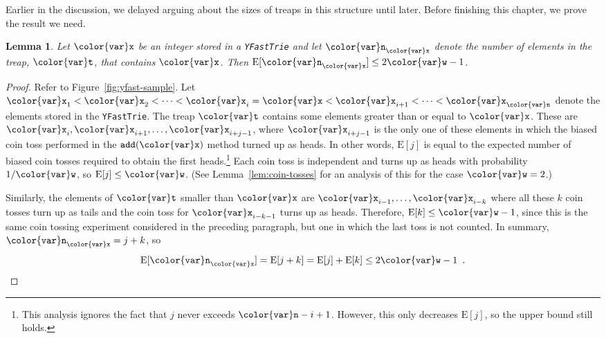 \documentclass[10pt]{book}
\newcommand{\figref}[1]{Figure~\ref{fig:#1}}
\theoremstyle{plain}
\newtheorem{lem}{Lemma}[chapter]
\newcommand{\lemlabel}[1]{\label{lem:#1}}
\newcommand{\lemref}[1]{Lemma~\ref{lem:#1}}
\theoremstyle{definition}
\newcommand{\E}{\mathrm{E}}
\begin{document}
Earlier in the discussion, we delayed arguing about the sizes of treaps
in this structure until later.  Before finishing this chapter, we prove
the result we need.

\begin{lem}\lemlabel{yfast-subtreesize}
Let \ensuremath{\mathtt{{\color{var}x}}} be an integer stored in a \texttt{YFastTrie} and let $\ensuremath{\mathtt{{\color{var}n}}}_\ensuremath{\mathtt{{\color{var}x}}}$
denote the number of elements in the treap, \ensuremath{\mathtt{{\color{var}t}}}, that contains \ensuremath{\mathtt{{\color{var}x}}}.
Then $\E[\ensuremath{\mathtt{{\color{var}n}}}_\ensuremath{\mathtt{{\color{var}x}}}] \le 2\ensuremath{\mathtt{{\color{var}w}}}-1$.
\end{lem}

\begin{proof}
Refer to \figref{yfast-sample}. Let
$\ensuremath{\mathtt{{\color{var}x}}}_1<\ensuremath{\mathtt{{\color{var}x}}}_2<\cdots<\ensuremath{\mathtt{{\color{var}x}}}_i=\ensuremath{\mathtt{{\color{var}x}}}<\ensuremath{\mathtt{{\color{var}x}}}_{i+1}<\cdots<\ensuremath{\mathtt{{\color{var}x}}}_\ensuremath{\mathtt{{\color{var}n}}}$ denote
the elements stored
in the \texttt{YFastTrie}.  The treap \ensuremath{\mathtt{{\color{var}t}}} contains some elements greater than
or equal to \ensuremath{\mathtt{{\color{var}x}}}.  These are $\ensuremath{\mathtt{{\color{var}x}}}_i,\ensuremath{\mathtt{{\color{var}x}}}_{i+1},\ldots,\ensuremath{\mathtt{{\color{var}x}}}_{i+j-1}$,
where $\ensuremath{\mathtt{{\color{var}x}}}_{i+j-1}$ is the only one of these elements in which the
biased coin toss performed in the \ensuremath{\mathtt{add({\color{var}x})}} method turned up as heads.
In other words, $\E[j]$ is equal to the expected number of biased coin
tosses required to obtain the first heads.\footnote{This analysis ignores
the fact that $j$ never exceeds $\ensuremath{\mathtt{{\color{var}n}}}-i+1$.  However, this only decreases
$\E[j]$, so the upper bound still holds.}  Each coin toss is independent
and turns up as heads with probability $1/\ensuremath{\mathtt{{\color{var}w}}}$, so $\E[j]\le\ensuremath{\mathtt{{\color{var}w}}}$.
(See \lemref{coin-tosses} for an analysis of this for the case $\ensuremath{\mathtt{{\color{var}w}}}=2$.)

Similarly, the elements of \ensuremath{\mathtt{{\color{var}t}}} smaller than \ensuremath{\mathtt{{\color{var}x}}} are
$\ensuremath{\mathtt{{\color{var}x}}}_{i-1},\ldots,\ensuremath{\mathtt{{\color{var}x}}}_{i-k}$ where all these $k$ coin tosses turn up as
tails and the coin toss for $\ensuremath{\mathtt{{\color{var}x}}}_{i-k-1}$ turns up as heads.  Therefore,
$\E[k]\le\ensuremath{\mathtt{{\color{var}w}}}-1$, since this is the same coin tossing experiment considered
in the preceding paragraph, but one in which the last toss is not counted.
In summary, $\ensuremath{\mathtt{{\color{var}n}}}_\ensuremath{\mathtt{{\color{var}x}}}=j+k$, so
\[  \E[\ensuremath{\mathtt{{\color{var}n}}}_\ensuremath{\mathtt{{\color{var}x}}}] = \E[j+k] = \E[j] + \E[k] \le 2\ensuremath{\mathtt{{\color{var}w}}}-1 \enspace .  \qedhere \]
\end{proof}
\end{document}
